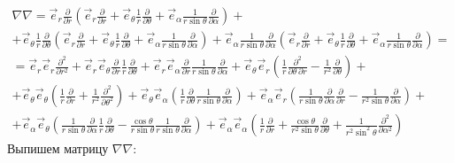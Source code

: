 \[
	\begin{gathered}
	\nabla\nabla = 
	\vec{e}_r \frac{\partial}{\partial r} 
	\left(\vec{e}_r \frac{\partial}{\partial r} + \vec{e}_\theta \frac{1}{r}\frac{\partial}{\partial \theta} + \vec{e}_\alpha \frac{1}{r \sin \theta}\frac{\partial}{\partial \alpha}\right)
	+ \\ +
	\vec{e}_\theta \frac{1}{r}\frac{\partial}{\partial \theta}
	\left(\vec{e}_r \frac{\partial}{\partial r} + \vec{e}_\theta \frac{1}{r}\frac{\partial}{\partial \theta} + \vec{e}_\alpha \frac{1}{r \sin \theta}\frac{\partial}{\partial \alpha}\right)
	+
	\vec{e}_\alpha \frac{1}{r \sin \theta}\frac{\partial}{\partial \alpha}
	\left(\vec{e}_r \frac{\partial}{\partial r} + \vec{e}_\theta \frac{1}{r}\frac{\partial}{\partial \theta} + \vec{e}_\alpha \frac{1}{r \sin \theta}\frac{\partial}{\partial \alpha}\right) 
	= \\ =
	\vec{e}_r \vec{e}_r \frac{\partial^2}{\partial r^2} +
	\vec{e}_r \vec{e}_\theta \frac{\partial}{\partial r} \frac{1}{r}\frac{\partial}{\partial \theta} +
	\vec{e}_r \vec{e}_\alpha \frac{\partial}{\partial r} \frac{1}{r \sin \theta}\frac{\partial}{\partial \alpha} +
	\vec{e}_\theta \vec{e}_r \left(\frac{1}{r} \frac{\partial^2}{\partial \theta\, \partial r} - \frac{1}{r^2} \frac{\partial}{\partial \theta} \right) + \\ +
	\vec{e}_\theta \vec{e}_\theta \left(\frac{1}{r} \frac{\partial}{\partial r} +
	\frac{1}{r^2} \frac{\partial^2}{\partial \theta^2} \right) +
	\vec{e}_\theta \vec{e}_\alpha \left(\frac{1}{r}\frac{\partial}{\partial \theta} \frac{1}{r \sin \theta}\frac{\partial}{\partial \alpha}\right) +
	\vec{e}_\alpha \vec{e}_r \left(\frac{1}{r \sin \theta} \frac{\partial}{\partial \alpha} \frac{\partial}{\partial r} - \frac{1}{r^2 \sin \theta} \frac{\partial}{\partial \alpha} \right) + \\ +
	\vec{e}_\alpha \vec{e}_\theta \left(\frac{1}{r \sin \theta}\frac{\partial}{\partial \alpha}\frac{1}{r}\frac{\partial}{\partial \theta} - \frac{\cos \theta}{r \sin \theta} \frac{1}{r \sin \theta}\frac{\partial}{\partial \alpha}\right) +
	\vec{e}_\alpha \vec{e}_\alpha \left(\frac{1}{r} \frac{\partial}{\partial r} + \frac{\cos \theta}{r^2 \sin \theta}\frac{\partial}{\partial \theta} + \frac{1}{r^2 \sin^2 \theta} \frac{\partial^2}{\partial \alpha^2} \right)
	\end{gathered}
\]
Выпишем матрицу $\nabla\nabla$:
